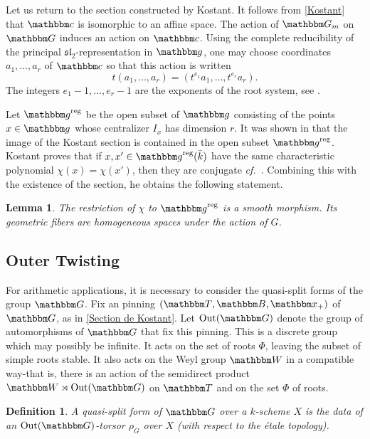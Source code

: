 \documentclass[12pt,english]{smfart}
\numberwithin{equation}{subsection}
\newtheorem{lemme}[equation]{Lemma}
\newtheorem{definition}[equation]{Definition}
\theoremstyle{remark}
\newcommand\GG{{\mathbbm G}}
\newcommand\bbB{{\mathbbm B}}
\newcommand\bbW{{\mathbbm W}}
\newcommand\bbT{{\mathbbm T}}
\newcommand\bbG{{\mathbbm G}}
\newcommand\bbx{{\mathbbm x}}
\newcommand\bbg{{\mathbbm g}}
\newcommand\bbc{{\mathbbm c}}
\newcommand\Out{{\rm Out}}
\newcommand\cf{{\it cf.\ }}
\newcommand\reg{{\rm reg}}
\begin{document}
Let us return to the section constructed by Kostant. It follows from \ref{Kostant} that $\bbc$ is isomorphic to an affine space. The action of $\GG_m$ on $\bbG$ induces an action on $\bbc$. Using the complete reducibility of the principal $\mathfrak{sl}_2$-representation in $\bbg$, one may choose coordinates $a_1,\ldots,a_r$ of $\bbc$ so that this action is written
$$t(a_1,\ldots,a_r)=(t^{e_1}a_1,\ldots,t^{e_r}a_r).$$
The integers $e_1-1,\ldots,e_r-1$ are the exponents of the root system, see \cite{Bourbaki}.

Let $\bbg^\reg$ be the open subset of $\bbg$ consisting of the points $x\in\bbg$ whose centralizer $I_x$ has dimension $r$. It was shown in \cite[Lemma 10]{Kos} that the image of the Kostant section is contained in the open subset $\bbg^\reg$. Kostant proves that if $x,x'\in\bbg^\reg(\bar k)$ have the same characteristic polynomial $\chi(x)=\chi(x')$, then they are conjugate \cf \cite[Th.~2]{Kos}. Combining this with the existence of the section, he obtains the following statement.

\begin{lemme}\label{Kostant reg}
The restriction of $\chi$ to $\bbg^\reg$ is a smooth morphism. Its geometric fibers are homogeneous spaces under the action of $G$.
\end{lemme}


\subsection{Outer Twisting}\label{Torsion exterieure}

For arithmetic applications, it is necessary to consider the quasi-split forms of the group $\GG$. Fix an pinning $(\bbT,\bbB,\bbx_+)$ of $\GG$, as in \ref{Section de Kostant}. Let $\Out(\GG)$ denote the group of automorphisms of $\GG$ that fix this pinning. This is a discrete group which may possibly be infinite. It acts on the set of roots $\Phi$, leaving the subset of simple roots stable. It also acts on the Weyl group $\bbW$ in a compatible way-that is, there is an action of the semidirect product $\bbW\rtimes \Out(\GG)$ on $\bbT$ and on the set $\Phi$ of roots.

\begin{definition}
A quasi-split form of $\GG$ over a $k$-scheme $X$ is the data of an $\Out(\GG)$-torsor $\rho_G$ over $X$ (with respect to the \'{e}tale topology).
\end{definition}
\end{document}
